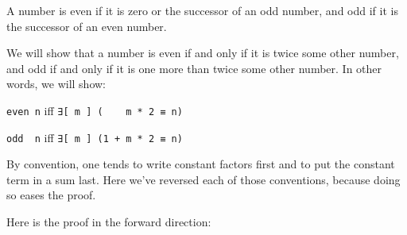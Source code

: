 A number is even if it is zero or the successor of an odd number, and
odd if it is the successor of an even number.

We will show that a number is even if and only if it is twice some other
number, and odd if and only if it is one more than twice some other
number. In other words, we will show:

\texttt{even\ n} iff \texttt{∃{[}\ m\ {]}\ (\ \ \ \ m\ *\ 2\ ≡\ n)}

\texttt{odd\ \ n} iff \texttt{∃{[}\ m\ {]}\ (1\ +\ m\ *\ 2\ ≡\ n)}

By convention, one tends to write constant factors first and to put the
constant term in a sum last. Here we've reversed each of those
conventions, because doing so eases the proof.

Here is the proof in the forward direction:

